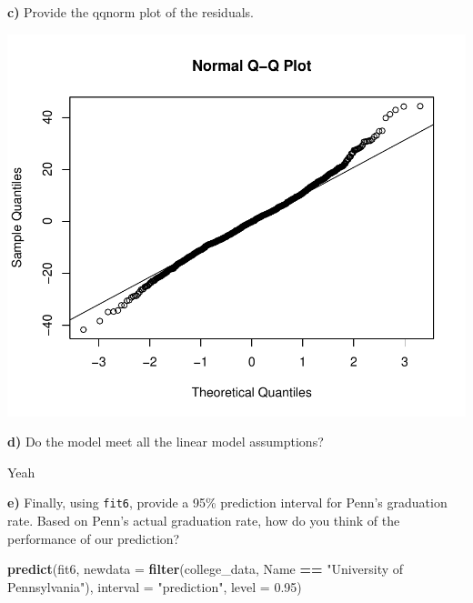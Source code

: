 \documentclass[]{article}
\newenvironment{Shaded}{\begin{snugshade}}{\end{snugshade}}
\newcommand{\KeywordTok}[1]{\textcolor[rgb]{0.13,0.29,0.53}{\textbf{#1}}}
\newcommand{\DataTypeTok}[1]{\textcolor[rgb]{0.13,0.29,0.53}{#1}}
\newcommand{\FloatTok}[1]{\textcolor[rgb]{0.00,0.00,0.81}{#1}}
\newcommand{\StringTok}[1]{\textcolor[rgb]{0.31,0.60,0.02}{#1}}
\newcommand{\OperatorTok}[1]{\textcolor[rgb]{0.81,0.36,0.00}{\textbf{#1}}}
\newcommand{\NormalTok}[1]{#1}
\begin{document}
\textbf{c)} Provide the qqnorm plot of the residuals.

\begin{Shaded}
\end{Shaded}

\begin{flushleft}\includegraphics{Midterm_11_01_2016_Answers_files/figure-latex/unnamed-chunk-36-1} \end{flushleft}

\textbf{d)} Do the model meet all the linear model assumptions?

Yeah

\textbf{e)} Finally, using \texttt{fit6}, provide a 95\% prediction
interval for Penn's graduation rate. Based on Penn's actual graduation
rate, how do you think of the performance of our prediction?

\begin{Shaded}
\begin{Highlighting}[]
\KeywordTok{predict}\NormalTok{(fit6, }\DataTypeTok{newdata =} \KeywordTok{filter}\NormalTok{(college_data, Name }\OperatorTok{==}\StringTok{ "University of Pennsylvania"}\NormalTok{), }
    \DataTypeTok{interval =} \StringTok{"prediction"}\NormalTok{, }\DataTypeTok{level =} \FloatTok{0.95}\NormalTok{)}
\end{Highlighting}
\end{Shaded}
\end{document}
